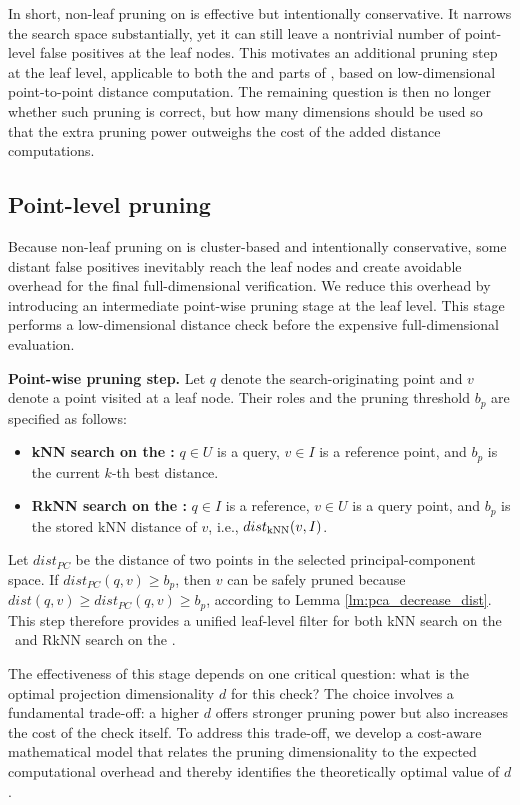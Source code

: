 In short, non-leaf pruning on \dualtree is effective but intentionally conservative. It narrows the search space substantially, yet it can still leave a nontrivial number of point-level false positives at the leaf nodes. This motivates an additional pruning step at the leaf level, applicable to both the \hdrtree and \deltatree parts of \dualtree, based on low-dimensional point-to-point distance computation. The remaining question is then no longer whether such pruning is correct, but how many dimensions should be used so that the extra pruning power outweighs the cost of the added distance computations.

\subsection{Point-level pruning}

Because non-leaf pruning on \dualtree is cluster-based and intentionally conservative, some distant false positives inevitably reach the leaf nodes and create avoidable overhead for the final full-dimensional verification. We reduce this overhead by introducing an intermediate point-wise pruning stage at the leaf level. This stage performs a low-dimensional distance check before the expensive full-dimensional evaluation.

\noindent\textbf{Point-wise pruning step.}
Let $q$ denote the search-originating point and $v$ denote a point visited at a leaf node. Their roles and the pruning threshold $b_p$ are specified as follows:
\begin{itemize}
\setlength{\itemsep}{0pt}
\setlength{\parsep}{0pt}
\setlength{\topsep}{0.2ex}
\setlength{\leftmargin}{1.4em}
\item \textbf{kNN search on the \deltatree:} $q\in U$ is a query, $v\in I$ is a reference point, and $b_p$ is the current $k$-th best distance.
\item \textbf{RkNN search on the \hdrtree:} $q\in I$ is a reference, $v\in U$ is a query point, and $b_p$ is the stored kNN distance of $v$, i.e., $dist_{\operatorname{kNN}}(v,I)$.
\end{itemize}
Let $dist_{PC}$ be the distance of two points in the selected principal-component space. If $dist_{PC}(q,v) \ge b_p$, then $v$ can be safely pruned because $dist(q,v)\ge dist_{PC}(q,v)\ge b_p$, according to Lemma \ref{lm:pca_decrease_dist}. This step therefore provides a unified leaf-level filter for both kNN search on the \deltatree\ and RkNN search on the \hdrtree.

The effectiveness of this stage depends on one critical question: what is the optimal projection dimensionality $d$ for this check? The choice involves a fundamental trade-off: a higher $d$ offers stronger pruning power but also increases the cost of the check itself. To address this trade-off, we develop a cost-aware mathematical model that relates the pruning dimensionality to the expected computational overhead and thereby identifies the theoretically optimal value of $d$.

